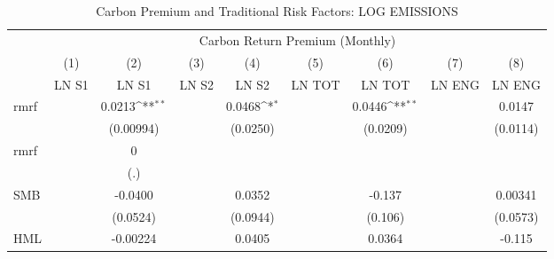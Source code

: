\begin{table}[htbp]\centering
\def\sym#1{\ifmmode^{#1}\else\(^{#1}\)\fi}
\caption{Carbon Premium and Traditional Risk Factors: LOG EMISSIONS}
\begin{tabular}{l*{8}{c}}
\hline\hline
                    &\multicolumn{8}{c}{Carbon Return Premium (Monthly)}                                                                                                                            \\\cmidrule(lr){2-9}
                    &\multicolumn{1}{c}{(1)}&\multicolumn{1}{c}{(2)}&\multicolumn{1}{c}{(3)}&\multicolumn{1}{c}{(4)}&\multicolumn{1}{c}{(5)}&\multicolumn{1}{c}{(6)}&\multicolumn{1}{c}{(7)}&\multicolumn{1}{c}{(8)}\\
                    &\multicolumn{1}{c}{LN S1}&\multicolumn{1}{c}{LN S1}&\multicolumn{1}{c}{LN S2}&\multicolumn{1}{c}{LN S2}&\multicolumn{1}{c}{LN TOT}&\multicolumn{1}{c}{LN TOT}&\multicolumn{1}{c}{LN ENG}&\multicolumn{1}{c}{LN ENG}\\
\hline
rmrf                &                     &      0.0213\sym{**} &                     &      0.0468\sym{*}  &                     &      0.0446\sym{**} &                     &      0.0147         \\
                    &                     &   (0.00994)         &                     &    (0.0250)         &                     &    (0.0209)         &                     &    (0.0114)         \\
rmrf                &                     &           0         &                     &                     &                     &                     &                     &                     \\
                    &                     &         (.)         &                     &                     &                     &                     &                     &                     \\
SMB                 &                     &     -0.0400         &                     &      0.0352         &                     &      -0.137         &                     &     0.00341         \\
                    &                     &    (0.0524)         &                     &    (0.0944)         &                     &     (0.106)         &                     &    (0.0573)         \\
HML                 &                     &    -0.00224         &                     &      0.0405         &                     &      0.0364         &                     &      -0.115         \\

\end{tabular}
\end{table}
